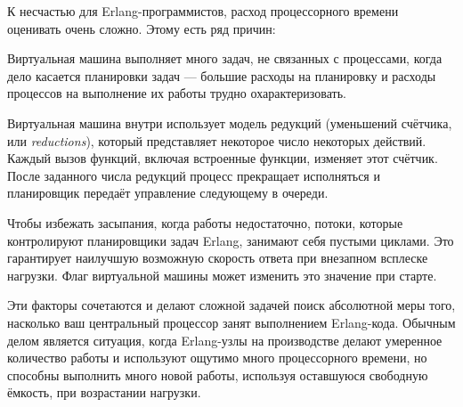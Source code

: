 К несчастью для Erlang-программистов, расход процессорного времени оценивать очень сложно. Этому есть ряд причин:

\begin{itemize*}
	\item Виртуальная машина выполняет много задач, не связанных с процессами, когда дело касается планировки задач --- большие расходы на планировку и расходы процессов на выполнение их работы трудно охарактеризовать.
	\item Виртуальная машина внутри использует модель редукций (уменьшений счётчика, или \emph{reductions}), который представляет некоторое число некоторых действий. Каждый вызов функций, включая встроенные функции, изменяет этот счётчик. После заданного числа редукций процесс прекращает исполняться и планировщик передаёт управление следующему в очереди.
	\item Чтобы избежать засыпания, когда работы недостаточно, потоки, которые контролируют планировщики задач Erlang, занимают себя пустыми циклами. Это гарантирует наилучшую возможную скорость ответа при внезапном всплеске нагрузки. Флаг виртуальной машины  может изменить это значение при старте.
\end{itemize*}

Эти факторы сочетаются и делают сложной задачей поиск абсолютной меры того, насколько ваш центральный процессор занят выполнением Erlang-кода. Обычным делом является ситуация, когда Erlang-узлы на производстве делают умеренное количество работы и используют ощутимо много процессорного времени, но способны выполнить много новой работы, используя оставшуюся свободную ёмкость, при возрастании нагрузки.

